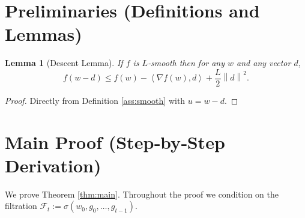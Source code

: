 \documentclass{article}
\newtheorem{lemma}{Lemma}
\newcommand{\norm}[1]{\left\|#1\right\|}
\newcommand{\inner}[2]{\left\langle #1,#2\right\rangle}
\begin{document}
\newpage
\section*{Preliminaries (Definitions and Lemmas)}
\begin{lemma}[Descent Lemma]\label{lem:descent}
If $f$ is $L$‑smooth then for any $w$ and any vector $d$,
\[
f(w-d)\le f(w)-\inner{\nabla f(w)}{d}+\frac{L}{2}\norm{d}^{2}.
\]
\end{lemma}
\begin{proof}
Directly from Definition \ref{ass:smooth} with $u=w-d$.
\end{proof}

\section*{Main Proof (Step‑by‑Step Derivation)}
We prove Theorem \ref{thm:main}. Throughout the proof we condition on the filtration $\mathcal{F}_t:=\sigma(w_0,g_0,\dots,g_{t-1})$.
\end{document}
